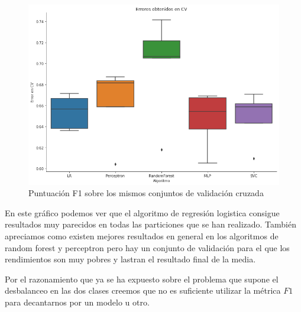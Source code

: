 \documentclass[11pt]{article}
\begin{document}
\begin{figure}[H]
    \centering
    \includegraphics[width=1\textwidth]{images/box_plot}
    \caption{Puntuación F1 sobre los mismos conjuntos de validación cruzada}
\end{figure}

En este gráfico podemos ver que el algoritmo de regresión logistica consigue
resultados muy parecidos en todas las particiones que se han realizado. También
apreciamos como existen mejores resultados en general en los algoritmos de
random forest y perceptron pero hay un conjunto de validación para el que los
rendimientos son muy pobres y lastran el resultado final de la media.

Por el razonamiento que ya se ha expuesto sobre el problema que supone el
desbalanceo en las dos clases creemos que no es suficiente utilizar la métrica 
$F1$ para decantarnos por un modelo u otro. 



%


\end{document}
